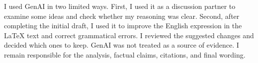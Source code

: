 I used GenAI in two limited ways. First, I used it as a discussion partner to examine some ideas and check whether my reasoning was clear. Second, after completing the initial draft, I used it to improve the English expression in the LaTeX text and correct grammatical errors. I reviewed the suggested changes and decided which ones to keep. GenAI was not treated as a source of evidence. I remain responsible for the analysis, factual claims, citations, and final wording.

\clearpage






